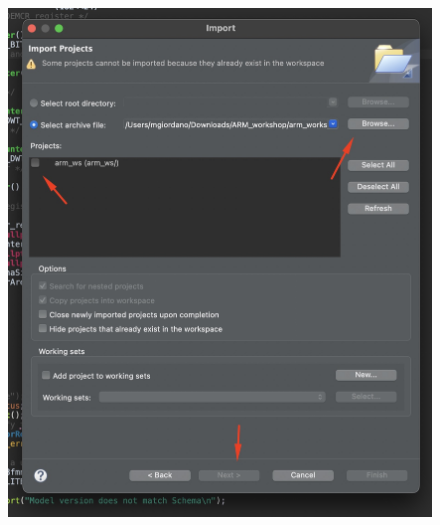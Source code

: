 \documentclass[parskip=half,notes,cadrem,toolver]{iisvlsi}
\begin{document}
\begin{itemize}
    \begin{figure}[H]
    \begin{center}
        \includegraphics[width=0.5\linewidth]{figures/import3.jpg}
    \end{center}
\end{figure}


\end{itemize}
\end{document}
